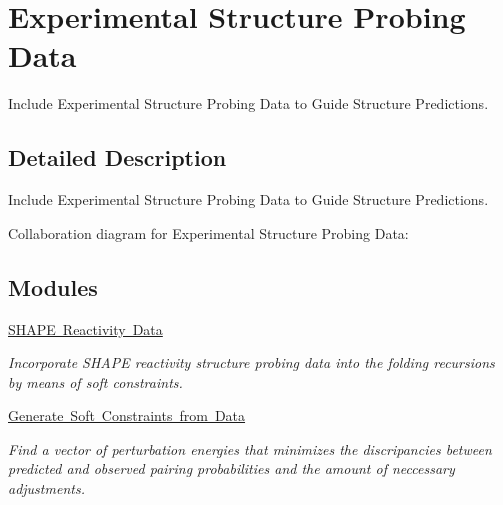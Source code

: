 \hypertarget{group__probing__data}{}\section{Experimental Structure Probing Data}
\label{group__probing__data}


Include Experimental Structure Probing Data to Guide Structure Predictions.  




\subsection{Detailed Description}
Include Experimental Structure Probing Data to Guide Structure Predictions. 

Collaboration diagram for Experimental Structure Probing Data\+:
\subsection*{Modules}
\begin{DoxyCompactItemize}
\item 
\mbox{\hyperlink{group__SHAPE__reactivities}{S\+H\+A\+P\+E Reactivity Data}}
\begin{DoxyCompactList}\small\item\em Incorporate S\+H\+A\+PE reactivity structure probing data into the folding recursions by means of soft constraints. \end{DoxyCompactList}\item 
\mbox{\hyperlink{group__perturbation}{Generate Soft Constraints from Data}}
\begin{DoxyCompactList}\small\item\em Find a vector of perturbation energies that minimizes the discripancies between predicted and observed pairing probabilities and the amount of neccessary adjustments. \end{DoxyCompactList}\end{DoxyCompactItemize}
